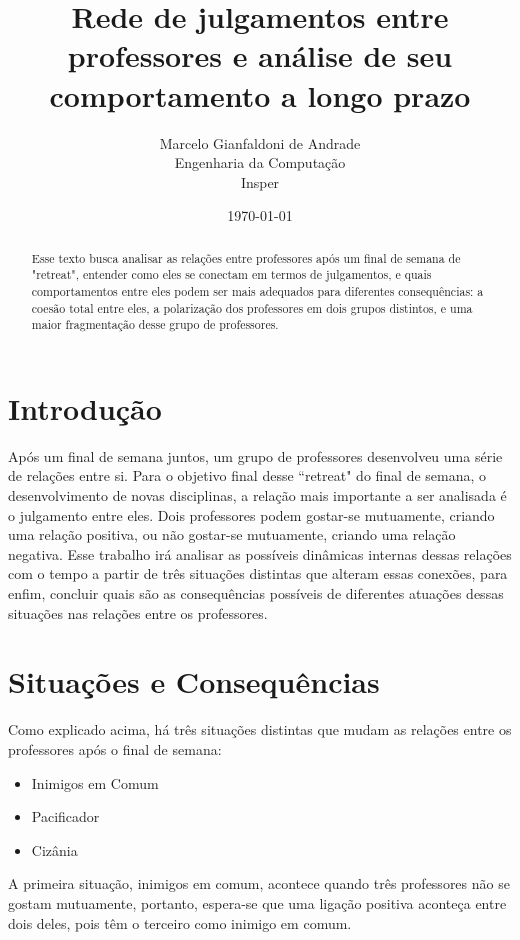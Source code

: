 \documentclass[12pt]{article}
\title{Rede de julgamentos entre professores e análise de seu comportamento a longo prazo}
\author{
	Marcelo Gianfaldoni de Andrade\\
	Engenharia da Computação\\
	Insper\\
}
\date{\today}
\begin{document}
\maketitle

\newpage
\tableofcontents
\newpage

\begin{abstract}
Esse texto busca analisar as relações entre professores após um final de semana de "retreat", entender como eles se conectam em termos de julgamentos, e quais comportamentos entre eles podem ser mais adequados para diferentes consequências: a coesão total entre eles, a polarização dos professores em dois grupos distintos, e uma maior fragmentação desse grupo de professores.
\end{abstract}

\section{Introdução}
Após um final de semana juntos, um grupo de professores desenvolveu uma série de relações entre si. Para o objetivo final desse ``retreat" do final de semana, o desenvolvimento de novas disciplinas, a relação mais importante a ser analisada é o julgamento entre eles. Dois professores podem gostar-se mutuamente, criando uma relação positiva, ou não gostar-se mutuamente, criando uma relação negativa. Esse trabalho irá analisar as possíveis dinâmicas internas dessas relações com o tempo a partir de três situações distintas que alteram essas conexões, para enfim, concluir quais são as consequências possíveis de diferentes atuações dessas situações nas relações entre os professores.

\section{Situações e Consequências}
Como explicado acima, há três situações distintas que mudam as relações entre os professores após o final de semana: 

\begin{itemize}
	\item Inimigos em Comum
	\item Pacificador
	\item Cizânia
\end{itemize}

A primeira situação, inimigos em comum, acontece quando três professores não se gostam mutuamente, portanto, espera-se que uma ligação positiva aconteça entre dois deles, pois têm o terceiro como inimigo em comum. 
\end{document}
